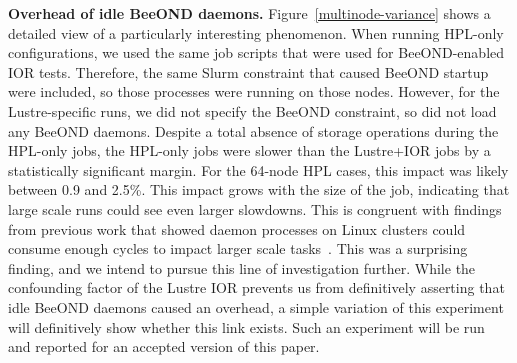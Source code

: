 {\bf Overhead of idle BeeOND daemons.} Figure~\ref{multinode-variance} shows a detailed view of a particularly interesting phenomenon. When running HPL-only configurations, we used the same job scripts that were used for BeeOND-enabled IOR tests. Therefore, the same Slurm constraint that caused BeeOND startup were included, so those processes were running on those nodes. However, for the Lustre-specific runs, we did not specify the BeeOND constraint, so did not load any BeeOND daemons. Despite a total absence of storage operations during the HPL-only jobs, the HPL-only jobs were slower than the Lustre+IOR jobs by a statistically significant margin. For the 64-node HPL cases, this impact was likely between 0.9 and 2.5\%. This impact grows with the size of the job, indicating that large scale runs could see even larger slowdowns. This is congruent with findings from previous work that showed daemon processes on Linux clusters could consume enough cycles to impact larger scale tasks~\cite{daemon-interference}. This was a surprising finding, and we intend to pursue this line of investigation further. While the confounding factor of the Lustre IOR prevents us from definitively asserting that idle BeeOND daemons caused an overhead, a simple variation of this experiment will definitively show whether this link exists. Such an experiment will be run and reported for an accepted version of this paper.
